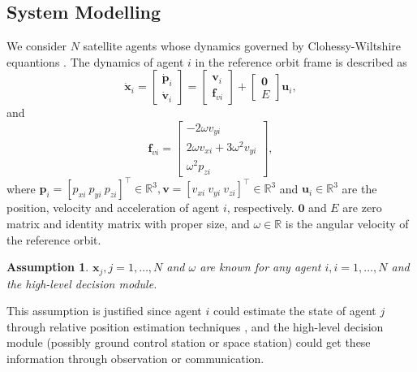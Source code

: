 \documentclass{ifacconf}
\newtheorem{assumption}[asmp]{Assumption}
\begin{document}
\subsection{System Modelling}
\par We consider $N$ satellite agents whose dynamics governed by Clohessy-Wiltshire equantions \cite[]{CWequations}.
The dynamics of agent $i$ in the reference orbit frame is described as
\begin{equation} \label{eqn:dynamics1}
   \dot{\boldsymbol{x}}_i = 
      \begin{bmatrix}
         \dot{\boldsymbol{p}}_i \\ \dot{\boldsymbol{v}}_i
      \end{bmatrix} = 
      \begin{bmatrix}
         \boldsymbol{v}_i \\ \boldsymbol{f}_{vi}
      \end{bmatrix} + 
      \begin{bmatrix}
         \boldsymbol{0} \\ E
      \end{bmatrix} \boldsymbol{u}_i,
\end{equation}
and
\begin{equation} \label{eqn:dynamics2}
   \boldsymbol{f}_{vi} = 
      \begin{bmatrix}
         -2 \omega v_{yi} \\
         2\omega v_{xi} + 3\omega^2 v_{yi} \\
         \omega^2 p_{zi}
      \end{bmatrix},
\end{equation}
where $\boldsymbol{p}_i = [p_{xi}~p_{yi}~p_{zi}]^{\top} \in \mathbb{R}^3, \boldsymbol{v} = [v_{xi}~v_{yi}~v_{zi}]^\top \in \mathbb{R}^3$ and $\boldsymbol{u}_i \in \mathbb{R}^3$ are the position, velocity and acceleration of agent $i$, respectively.
$\boldsymbol{0}$ and $E$ are zero matrix and identity matrix with proper size, and $\omega \in \mathbb{R}$ is the angular velocity of the reference orbit.

\begin{assumption}
$\boldsymbol{x}_j, j = 1, \dots, N$ and $\omega$ are known for any agent $i, i = 1, \dots, N$ and the high-level decision module.
\end{assumption}
\par This assumption is justified since agent $i$ could estimate the state of agent $j$ through relative position estimation techniques \cite[]{XXX}, and the high-level decision module (possibly ground control station or space station) could get these information through observation \cite[]{XXX} or communication.
\end{document}

